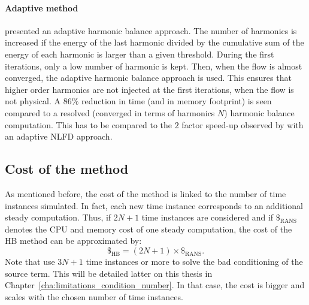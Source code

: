 \paragraph{Adaptive method}
\citet{Maple2004} presented an adaptive harmonic
balance approach. The number of harmonics is increased
if the energy of the last harmonic divided by the cumulative
sum of the energy of each harmonic is larger than a 
given threshold. During the first iterations, only
a low number of harmonic is kept. Then, when the flow
is almost converged, the adaptive harmonic balance
approach is used. This ensures that higher order harmonics
are not injected at the first iterations, when the
flow is not physical. A $86\%$ reduction in time (and
in memory footprint) is seen compared to a resolved (converged in
terms of harmonics $N$) harmonic
balance computation. This has to be compared to
the $2$ factor speed-up observed by \citet{Mosahebi2013}
with an adaptive NLFD approach.

\subsection{Cost of the method}
\label{sec:sm_hb_cost}
As mentioned before, the cost of the method is linked to
the number of time instances simulated.
In fact, each new time instance corresponds to an additional steady computation.
Thus, if \mbox{$2N+1$} time instances are considered and if $\mathdollar_{\text{RANS}}$ 
denotes the CPU and memory cost of
one steady computation, the cost of the HB method can be 
approximated by:
\begin{equation}
	\mathdollar_{\text{HB}} = (2N+1) \times \mathdollar_{\text{RANS}}.
\end{equation}
Note that \citet{Ekici2007,Ekici2008a} use $3N+1$
time instances or more to solve the bad conditioning of the
source term. This will be detailed latter on this thesis in 
Chapter~\ref{cha:limitations_condition_number}. In that
case, the cost is bigger and scales with the chosen number
of time instances.